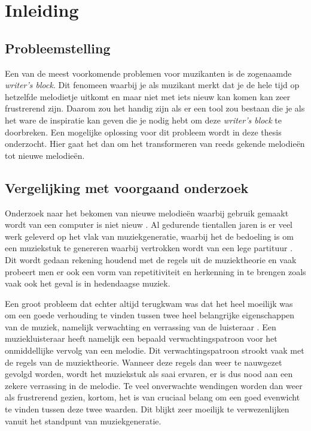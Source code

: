 \chapter{Inleiding}
\label{hoofdstuk:I}


\section{Probleemstelling}
Een van de meest voorkomende problemen voor muzikanten is de zogenaamde \textit{writer's block}. Dit fenomeen waarbij je als muzikant merkt dat je de hele tijd op hetzelfde melodietje uitkomt en maar niet met iets nieuw kan komen kan zeer frustrerend zijn. Daarom zou het handig zijn als er een tool zou bestaan die je als het ware de inspiratie kan geven die je nodig hebt om deze \textit{writer's block} te doorbreken. Een mogelijke oplossing voor dit probleem wordt in deze thesis onderzocht. Hier gaat het dan om het transformeren van reeds gekende melodie\"en tot nieuwe melodie\"en.

\section{Vergelijking met voorgaand onderzoek}
Onderzoek naar het bekomen van nieuwe melodie\"en waarbij gebruik gemaakt wordt van een computer is niet nieuw \cite{thesis:thomas} \cite{book:musicAndProbability}. Al gedurende tientallen jaren is er veel werk geleverd op het vlak van muziekgeneratie, waarbij het de bedoeling is om een muziekstuk te genereren waarbij vertrokken wordt van een lege partituur \cite{book:musicGeeksNerds}. Dit wordt gedaan rekening houdend met de regels uit de muziektheorie en vaak probeert men er ook een vorm van repetitiviteit en herkenning in te brengen zoals vaak ook het geval is in hedendaagse muziek. 

Een groot probleem dat echter altijd terugkwam was dat het heel moeilijk was om een goede verhouding te vinden tussen twee heel belangrijke eigenschappen van de muziek, namelijk verwachting en verrassing van de luisteraar \cite{book:musimathics}. Een muziekluisteraar heeft namelijk een bepaald verwachtingspatroon voor het onmiddellijke vervolg van een melodie. Dit verwachtingspatroon strookt vaak met de regels van de muziektheorie. Wanneer deze regels dan weer te nauwgezet gevolgd worden, wordt het muziekstuk als saai ervaren, er is dus nood aan een zekere verrassing in de melodie. Te veel onverwachte wendingen worden dan weer als frustrerend gezien, kortom, het is van cruciaal belang om een goed evenwicht te vinden tussen deze twee waarden. Dit blijkt zeer moeilijk te verwezenlijken vanuit het standpunt van muziekgeneratie.\\

